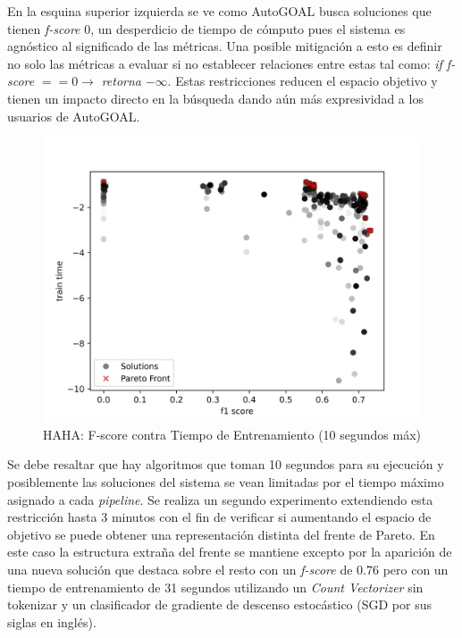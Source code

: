 En la esquina superior izquierda se ve como AutoGOAL busca soluciones que tienen \textit{f-score} 0, un desperdicio de tiempo de c\'omputo pues el sistema es agn\'ostico al significado de las m\'etricas. Una posible mitigaci\'on a esto es definir no solo las m\'etricas a evaluar si no establecer relaciones entre estas tal como: \textit{if f-score} $== 0 \rightarrow $ \textit{retorna} $-\infty$. Estas restricciones reducen el espacio objetivo y tienen un impacto directo en la b\'usqueda dando a\'un m\'as expresividad a los usuarios de AutoGOAL.

\begin{figure}[ht]
    \centering
    \includegraphics[scale=0.65]{Pictures/haha_fscore_vs_time.jpg}
    \caption{HAHA: F-score contra Tiempo de Entrenamiento (10 segundos m\'ax)}
    \label{impl:fig:haha:fscore_vs_time}
\end{figure}

Se debe resaltar que hay algoritmos que toman 10 segundos para su ejecuci\'on y posiblemente las soluciones del sistema se vean limitadas por el tiempo m\'aximo asignado a cada \textit{pipeline}. Se realiza un segundo experimento extendiendo esta restricci\'on hasta 3 minutos con el fin de verificar si aumentando el espacio de objetivo se puede obtener una representaci\'on distinta del frente de Pareto. En este caso la estructura extra\~na del frente se mantiene excepto por la aparici\'on de una nueva soluci\'on que destaca sobre el resto con un \textit{f-score} de 0.76 pero con un tiempo de entrenamiento de 31 segundos utilizando un \textit{Count Vectorizer} sin tokenizar y un  clasificador  de gradiente de descenso estoc\'astico (SGD por sus siglas en ingl\'es).

